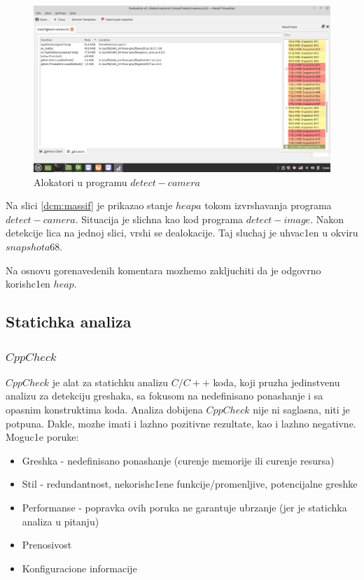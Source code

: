 \documentclass{article}
\begin{document}
\begin{figure}[H]
    \centering
    \includegraphics[width=12cm]{img/massif/massif_detect_camera_allocators.png}
    \caption{Alokatori u programu $detect-camera$}
    \label{dcma:massif}
\end{figure}


Na slici \ref{dcm:massif} je prikazao stanje $heapa$ tokom izvrshavanja programa $detect-camera.$
Situacija je slichna kao kod programa $detect-image.$ Nakon detekcije lica na jednoj slici, vrshi se dealokacije. Taj sluchaj je uhvac1en u okviru $snapshota 68.$

Na osnovu gorenavedenih komentara mozhemo zakljuchiti da je odgovrno korishc1en $heap$.
\subsection{Statichka analiza}
\subsubsection{$CppCheck$}
$CppCheck$ je alat za statichku analizu $C/C++$ koda, koji pruzha jedinstvenu analizu za detekciju greshaka, sa fokusom na nedefinisano ponashanje i sa opasnim konstruktima koda. Analiza dobijena $CppCheck$ nije ni saglasna, niti je potpuna. Dakle, mozhe imati i lazhno pozitivne rezultate, kao i lazhno negativne.
Moguc1e poruke:
\begin{itemize}
    \item Greshka - nedefinisano ponashanje (curenje memorije ili curenje resursa)
    \item Stil - redundantnost, nekorish\-c1ene funkcije/promenljive, potencijalne greshke
    \item Performanse - popravka ovih poruka ne garantuje ubrzanje (jer je statichka analiza u pitanju)
    \item Prenosivost
    \item Konfiguracione informacije
\end{itemize}
\end{document}
